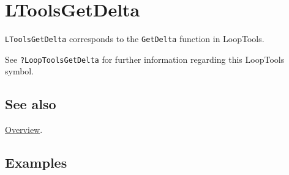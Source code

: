 \documentclass[../FeynHelpersManual.tex]{subfiles}
\begin{document}
\hypertarget{ltoolsgetdelta}{
\section{LToolsGetDelta}\label{ltoolsgetdelta}}

\texttt{LToolsGetDelta} corresponds to the \texttt{GetDelta} function in
LoopTools.

See \texttt{?LoopTools\textasciigrave GetDelta} for further information
regarding this LoopTools symbol.

\subsection{See also}

\hyperlink{toc}{Overview}.

\subsection{Examples}
\end{document}
